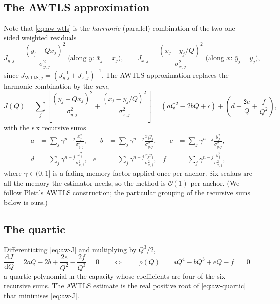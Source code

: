 \subsection{The AWTLS approximation}
Note that \eqref{eq:aw-wtls} is the \emph{harmonic} (parallel) combination of the two one-sided
weighted residuals
\begin{equation}
J_{y,j}=\frac{(y_j-Qx_j)^2}{\sigma_{y,j}^2}
\;\text{(along }y\text{: }\bar x_j=x_j\text{)},
\qquad
J_{x,j}=\frac{(x_j-y_j/Q)^2}{\sigma_{x,j}^2}
\;\text{(along }x\text{: }\bar y_j=y_j\text{)},
\label{eq:aw-onesided}
\end{equation}
since $J_{\text{WTLS},j}=\left(J_{y,j}^{-1}+J_{x,j}^{-1}\right)^{-1}$.  The AWTLS approximation
replaces the harmonic combination by the \emph{sum},
\begin{equation}
J(Q)=\sum_j\left[\frac{(y_j-Qx_j)^2}{\sigma_{y,j}^2}+\frac{(x_j-y_j/Q)^2}{\sigma_{x,j}^2}\right]
= \left(aQ^2-2bQ+c\right)+\left(d-\frac{2e}{Q}+\frac{f}{Q^2}\right),
\label{eq:aw-J}
\end{equation}
with the six recursive sums
\begin{equation}
\begin{aligned}
a&=\sum_j\gamma^{n-j}\frac{x_j^2}{\sigma_{y,j}^2}, &\quad
b&=\sum_j\gamma^{n-j}\frac{x_jy_j}{\sigma_{y,j}^2}, &\quad
c&=\sum_j\gamma^{n-j}\frac{y_j^2}{\sigma_{y,j}^2},\\
d&=\sum_j\gamma^{n-j}\frac{x_j^2}{\sigma_{x,j}^2}, &
e&=\sum_j\gamma^{n-j}\frac{x_jy_j}{\sigma_{x,j}^2}, &
f&=\sum_j\gamma^{n-j}\frac{y_j^2}{\sigma_{x,j}^2},
\end{aligned}
\label{eq:aw-sums}
\end{equation}
where $\gamma\in(0,1]$ is a fading-memory factor applied once per anchor.  Six scalars are all the
memory the estimator needs, so the method is $\mathcal{O}(1)$ per anchor.  (We follow Plett's AWTLS
construction; the particular grouping of the recursive sums below is ours.)

\subsection{The quartic}
Differentiating \eqref{eq:aw-J} and multiplying by $Q^3/2$,
\begin{equation}
\frac{\mathrm{d}J}{\mathrm{d}Q}=2aQ-2b+\frac{2e}{Q^2}-\frac{2f}{Q^3}=0
\qquad\Longleftrightarrow\qquad
\boxed{\;p(Q)\;=\;aQ^4-bQ^3+eQ-f\;=\;0\;}
\label{eq:aw-quartic}
\end{equation}
a quartic polynomial in the capacity whose coefficients are four of the six recursive sums.  The
AWTLS estimate is the real positive root of \eqref{eq:aw-quartic} that minimises \eqref{eq:aw-J}.

